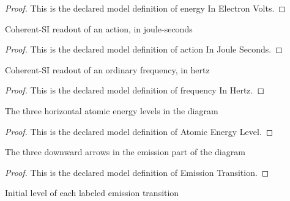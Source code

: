 \begin{proof}
  This is the declared model definition of energy In Electron Volts.
\end{proof}
\begin{definition}
  \label{def:physics:phyx-mini-0517:phyxminiproblems-problemphyxmini0517-actioninjouleseconds}
  Coherent-SI readout of an action, in joule-seconds
\end{definition}
\begin{proof}
  This is the declared model definition of action In Joule Seconds.
\end{proof}
\begin{definition}
  \label{def:physics:phyx-mini-0517:phyxminiproblems-problemphyxmini0517-frequencyinhertz}
  Coherent-SI readout of an ordinary frequency, in hertz
\end{definition}
\begin{proof}
  This is the declared model definition of frequency In Hertz.
\end{proof}
\begin{definition}
  \label{def:physics:phyx-mini-0517:phyxminiproblems-problemphyxmini0517-atomicenergylevel}
  The three horizontal atomic energy levels in the diagram
\end{definition}
\begin{proof}
  This is the declared model definition of Atomic Energy Level.
\end{proof}
\begin{definition}
  \label{def:physics:phyx-mini-0517:phyxminiproblems-problemphyxmini0517-emissiontransition}
  The three downward arrows in the emission part of the diagram
\end{definition}
\begin{proof}
  This is the declared model definition of Emission Transition.
\end{proof}
\begin{definition}
  \label{def:physics:phyx-mini-0517:phyxminiproblems-problemphyxmini0517-emissiontransition-initiallevel}
  Initial level of each labeled emission transition
\end{definition}
